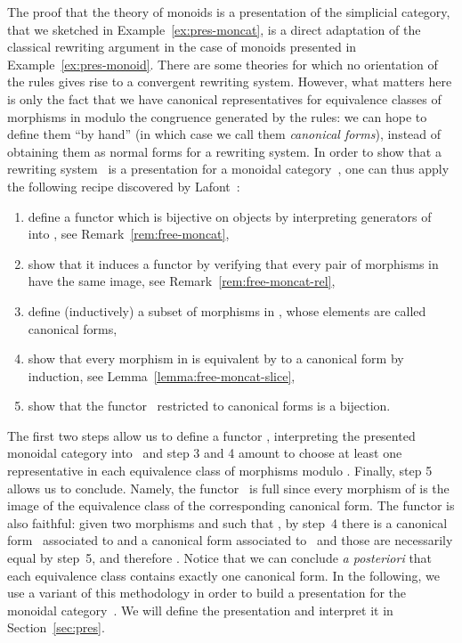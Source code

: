 \documentclass[submission,copyright,creativecommons]{eptcs}
\theoremstyle{definition}
\theoremstyle{remark}
\begin{document}
The proof that the theory of monoids is a presentation of the simplicial
category, that we sketched in Example~\ref{ex:pres-moncat}, is a direct
adaptation of the classical rewriting argument in the case of monoids presented
in Example~\ref{ex:pres-monoid}. There are some theories for which no
orientation of the rules gives rise to a convergent rewriting system. However,
what matters here is only the fact that we have canonical representatives for
equivalence classes of morphisms in  modulo the congruence generated
by the rules: we can hope to define them ``by hand'' (in which case we call them
\emph{canonical forms}), instead of obtaining them as normal forms for a
rewriting system. In order to show that a rewriting system~ is a
presentation for a monoidal category~, one can thus apply the following
recipe discovered by Lafont~\cite{lafont2003towards}:
\begin{enumerate}
\item define a functor  which is bijective on objects by
  interpreting generators of  into , see
  Remark~\ref{rem:free-moncat},
\item show that it induces a functor  by verifying
  that every pair of morphisms in  have the same image, see
  Remark~\ref{rem:free-moncat-rel},
\item define (\eg inductively) a subset of morphisms in , whose
  elements are called canonical forms,
\item show that every morphism in  is equivalent by  to a
  canonical form by induction, see Lemma~\ref{lemma:free-moncat-slice},
\item show that the functor~ restricted to canonical forms is a bijection.
\end{enumerate}
The first two steps allow us to define a functor ,
interpreting the presented monoidal category into~ and step 3 and 4 amount
to choose at least one representative in each equivalence class of morphisms
modulo . Finally, step 5 allows us to conclude. Namely, the
functor~ is full since every morphism of  is the image of the equivalence
class of the corresponding canonical form. The functor is also faithful: given
two morphisms  and  such that , by step~4 there is a canonical
form~ associated to  and a canonical form  associated to~
and those are necessarily equal by step~5, and therefore . Notice that we
can conclude \emph{a posteriori} that each equivalence class contains exactly
one canonical form.
In the following, we use a variant of this methodology in order to build a
presentation for the monoidal category~. We will define the presentation and
interpret it in Section~\ref{sec:pres}.
\end{document}
